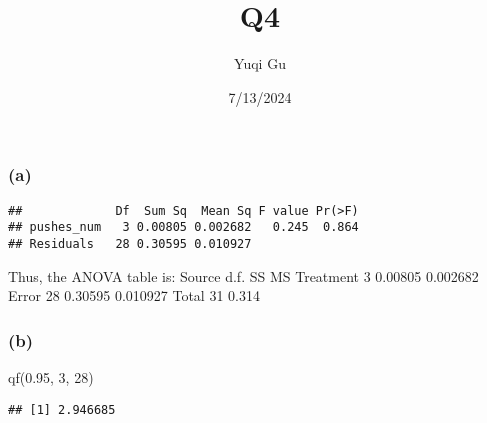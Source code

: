 \documentclass[
]{article}
\title{Q4}
\author{Yuqi Gu}
\date{7/13/2024}
\newenvironment{Shaded}{\begin{snugshade}}{\end{snugshade}}
\newcommand{\AttributeTok}[1]{\textcolor[rgb]{0.77,0.63,0.00}{#1}}
\newcommand{\DecValTok}[1]{\textcolor[rgb]{0.00,0.00,0.81}{#1}}
\newcommand{\FloatTok}[1]{\textcolor[rgb]{0.00,0.00,0.81}{#1}}
\newcommand{\FunctionTok}[1]{\textcolor[rgb]{0.00,0.00,0.00}{#1}}
\newcommand{\NormalTok}[1]{#1}
\newcommand{\OtherTok}[1]{\textcolor[rgb]{0.56,0.35,0.01}{#1}}
\newcommand{\SpecialCharTok}[1]{\textcolor[rgb]{0.00,0.00,0.00}{#1}}
\newcommand{\StringTok}[1]{\textcolor[rgb]{0.31,0.60,0.02}{#1}}
\begin{document}
\maketitle

\hypertarget{a}{%
\subsubsection{(a)}\label{a}}

\begin{Shaded}
\end{Shaded}

\begin{verbatim}
##             Df  Sum Sq  Mean Sq F value Pr(>F)
## pushes_num   3 0.00805 0.002682   0.245  0.864
## Residuals   28 0.30595 0.010927
\end{verbatim}

Thus, the ANOVA table is: Source d.f. SS MS Treatment 3 0.00805 0.002682
Error 28 0.30595 0.010927 Total 31 0.314

\hypertarget{b}{%
\subsubsection{(b)}\label{b}}

\begin{Shaded}
\begin{Highlighting}[]
\FunctionTok{qf}\NormalTok{(}\FloatTok{0.95}\NormalTok{, }\DecValTok{3}\NormalTok{, }\DecValTok{28}\NormalTok{)}
\end{Highlighting}
\end{Shaded}

\begin{verbatim}
## [1] 2.946685
\end{verbatim}
\end{document}
